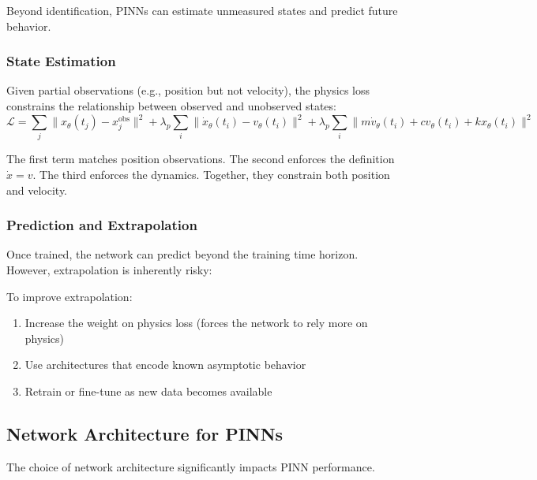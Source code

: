 Beyond identification, PINNs can estimate unmeasured states and predict future behavior.

\subsubsection{State Estimation}

Given partial observations (e.g., position but not velocity), the physics loss constrains the relationship between observed and unobserved states:
\begin{equation}
\mathcal{L} = \sum_j \|x_\theta(t_j) - x_j^{\text{obs}}\|^2 + \lambda_p \sum_i \|\dot{x}_\theta(t_i) - v_\theta(t_i)\|^2 + \lambda_p \sum_i \|m\dot{v}_\theta(t_i) + cv_\theta(t_i) + kx_\theta(t_i)\|^2
\end{equation}

The first term matches position observations. The second enforces the definition $\dot{x} = v$. The third enforces the dynamics. Together, they constrain both position and velocity.

\subsubsection{Prediction and Extrapolation}

Once trained, the network can predict beyond the training time horizon. However, extrapolation is inherently risky:


To improve extrapolation:
\begin{enumerate}
    \item Increase the weight on physics loss (forces the network to rely more on physics)
    \item Use architectures that encode known asymptotic behavior
    \item Retrain or fine-tune as new data becomes available
\end{enumerate}

\subsection{Network Architecture for PINNs}

The choice of network architecture significantly impacts PINN performance.

